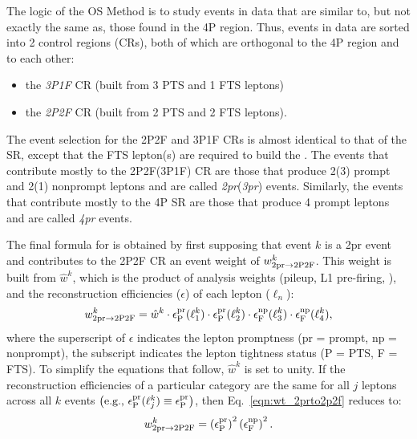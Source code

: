 The logic of the OS Method is to study events in data that are similar to, but not exactly the same as, those found in the 4P region.
Thus, events in data are sorted into 2 control regions (CRs), both of which are orthogonal to the 4P region and to each other:
\begin{itemize}
	\item the \emph{3P1F} CR (built from 3 PTS and 1 FTS leptons)
	\item the \emph{2P2F} CR (built from 2 PTS and 2 FTS leptons).
\end{itemize}
The event selection for the 2P2F and 3P1F CRs is almost identical to that of the SR, %
except that the FTS lepton(s) are required to build the \Ztwo.
The events that contribute mostly to the 2P2F(3P1F) CR are those that produce 2(3) prompt and 2(1) nonprompt leptons and are called \emph{2pr}(\emph{3pr}) events.
Similarly, the events that contribute mostly to the 4P SR are those that produce 4 prompt leptons and are called \emph{4pr} events.

The final formula for \nfourPRB is obtained by first supposing that event $k$ is a 2pr event and contributes to the 2P2F CR an event weight of $w_{\text{2pr} \to \text{2P2F}}^k$.
This weight is built from $\hat{w}^k$, which is the product of analysis weights (pileup, L1 pre-firing, \etc), and the reconstruction efficiencies ($\epsilon$) of each lepton ($\ell_n$):
\begin{equation}
	\label{eqn:wt_2prto2p2f}
	w_{\text{2pr} \to \text{2P2F}}^k = \hat{w}^k \cdot \epsilon^\text{pr}_\text{P}(\ell_1^k) \cdot \epsilon^\text{pr}_\text{P}(\ell_2^k) \cdot \epsilon^\text{np}_\text{F}(\ell_3^k) \cdot \epsilon^\text{np}_\text{F}(\ell_4^k),
\end{equation}
where the superscript of $\epsilon$ indicates the lepton promptness (pr = prompt, np = nonprompt),
the subscript indicates the lepton tightness status (P = PTS, F = FTS).
To simplify the equations that follow, $\hat{w}^k$ is set to unity.
If the reconstruction efficiencies of a particular category are the same for all $j$ leptons across all $k$ events $\left( \mbox{e.g.,} ~ \epsilon^\text{pr}_\text{P}(\ell_j^k) \equiv \epsilon^\text{pr}_\text{P} \right)$, then Eq.~\ref{eqn:wt_2prto2p2f} reduces to:
\begin{equation}
	\label{eqn:wt_2prto2p2f_simp}
	w_{\text{2pr} \to \text{2P2F}}^k = 
	\left( \epsilon^\text{pr}_\text{P} \right)^2 
	\left( \epsilon^\text{np}_\text{F} \right)^2.
\end{equation}

